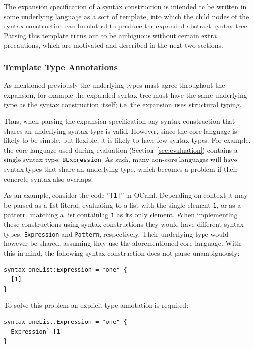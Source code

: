 \documentclass{kththesis}
\begin{document}
The expansion specification of a syntax construction is intended to be written in some underlying language as a sort of template, into which the child nodes of the syntax construction can be slotted to produce the expanded abstract syntax tree. Parsing this template turns out to be ambiguous without certain extra precautions, which are motivated and described in the next two sections.

\subsubsection{Template Type Annotations}

As mentioned previously the underlying types must agree throughout the expansion, for example the expanded syntax tree must have the same underlying type as the syntax construction itself; i.e. the expansion uses structural typing.

Thus, when parsing the expansion specification any syntax construction that shares an underlying syntax type is valid. However, since the core language is likely to be simple, but flexible, it is likely to have few syntax types. For example, the core language used during evaluation (Section~\ref{sec:evaluation}) contains a single syntax type: \texttt{BExpression}. As such, many non-core languages will have syntax types that share an underlying type, which becomes a problem if their concrete syntax also overlaps.

As an example, consider the code ''\texttt{[1]}'' in OCaml. Depending on context it may be parsed as a list literal, evaluating to a list with the single element \texttt{1}, or as a pattern, matching a list containing \texttt{1} as its only element. When implementing these constructions using syntax constructions they would have different syntax types, \texttt{Expression} and \texttt{Pattern}, respectively. Their underlying type would however be shared, assuming they use the aforementioned core language. With this in mind, the following syntax construction does not parse unambiguously:

\begin{verbatim}
syntax oneList:Expression = "one" {
  [1]
}
\end{verbatim}

To solve this problem an explicit type annotation is required:

\begin{verbatim}
syntax oneList:Expression = "one" {
  Expression` [1]
}
\end{verbatim}
\end{document}
